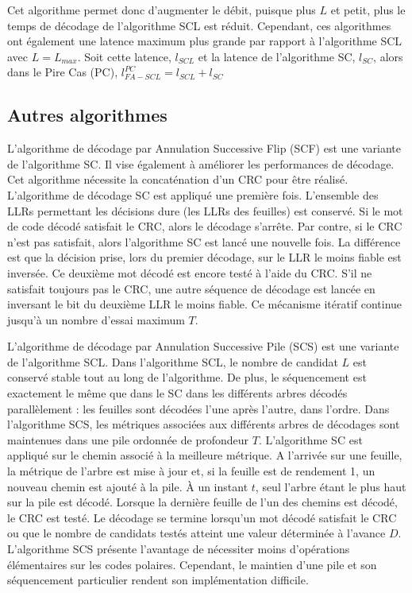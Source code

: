 Cet algorithme permet donc d'augmenter le débit, puisque plus $L$ et petit, plus le temps de décodage de l'algorithme SCL est réduit. Cependant, ces algorithmes ont également une latence maximum plus grande par rapport à l'algorithme SCL avec $L=L_{max}$. Soit cette latence, $l_{SCL}$ et la latence de l'algorithme SC, $l_{SC}$, alors dans le Pire Cas (PC), $l^{PC}_{FA-SCL}=l_{SCL}+l_{SC}$


\subsection{Autres algorithmes}
	L'algorithme de décodage par Annulation Successive Flip (SCF) \cite{afisiadis_low-complexity_2014} est une variante de l'algorithme SC. Il vise également à améliorer les performances de décodage. Cet algorithme nécessite la concaténation d'un CRC pour être réalisé. L'algorithme de décodage SC est appliqué une première fois. L'ensemble des LLRs permettant les décisions dure (les LLRs des feuilles) est conservé. Si le mot de code décodé satisfait le CRC, alors le décodage s'arrête. Par contre, si le CRC n'est pas satisfait, alors l'algorithme SC est lancé une nouvelle fois. La différence est que la décision prise, lors du premier décodage, sur le LLR le moins fiable est inversée. Ce deuxième mot décodé est encore testé à l'aide du CRC. S'il ne satisfait toujours pas le CRC, une autre séquence de décodage est lancée en inversant le bit du deuxième LLR le moins fiable. Ce mécanisme itératif continue jusqu'à un nombre d'essai maximum $T$.


	L'algorithme de décodage par Annulation Successive Pile (SCS) \cite{chen_improved_2013} est une variante de l'algorithme SCL. Dans l'algorithme SCL, le nombre de candidat $L$ est conservé stable tout au long de l'algorithme. De plus, le séquencement est exactement le même que dans le SC dans les différents arbres décodés parallèlement : les feuilles sont décodées l'une après l'autre, dans l'ordre. Dans l'algorithme SCS, les métriques associées aux différents arbres de décodages sont maintenues dans une pile ordonnée de profondeur $T$. L'algorithme SC est appliqué sur le chemin associé à la meilleure métrique. A l'arrivée sur une feuille, la métrique de l'arbre est mise à jour et, si la feuille est de rendement 1, un nouveau chemin est ajouté à la pile. \`A un instant $t$, seul l'arbre étant le plus haut sur la pile est décodé. Lorsque la dernière feuille de l'un des chemins est décodé, le CRC est testé. Le décodage se termine lorsqu'un mot décodé satisfait le CRC ou que le nombre de candidats testés atteint une valeur déterminée à l'avance $D$. L'algorithme SCS présente l'avantage de nécessiter moins d'opérations élémentaires sur les codes polaires. Cependant, le maintien d'une pile et son séquencement particulier rendent son implémentation difficile.


